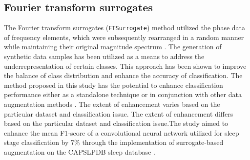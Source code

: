 \documentclass[runningheads]{llncs}
\begin{document}
\subsection{Fourier transform surrogates}
The Fourier transform surrogates (\texttt{FTSurrogate}) method utilized the phase data of frequency elements, which were subsequently rearranged in a random manner while maintaining their original magnitude spectrum \cite{schwabedal2018addressing}. The generation of synthetic data samples has been utilized as a means to address the underrepresentation of certain classes. This approach has been shown to improve the balance of class distribution and enhance the accuracy of classification. The method proposed in this study has the potential to enhance classification performance either as a standalone technique or in conjunction with other data augmentation methods \cite{schwabedal2018addressing}. The extent of enhancement varies based on the particular dataset and classification issue. The extent of enhancement differs based on the particular dataset and classification issue.The study aimed to enhance the mean F1-score of a convolutional neural network utilized for sleep stage classification by 7\% through the implementation of surrogate-based augmentation on the CAPSLPDB sleep database \cite{terzano2001atlas}.
\end{document}
